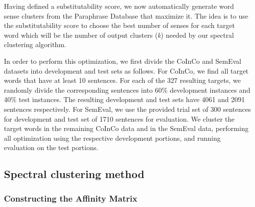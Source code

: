 \documentclass[11pt]{article}
\begin{document}
Having defined a substitutability score, we now automatically generate word sense clusters from the Paraphrase Database that maximize it. The idea is to use the substitutability score to choose the best number of senses for each target word which will be the number of output clusters (\textit{k}) needed by our spectral clustering algorithm. 

In order to perform this optimization, we first divide the CoInCo and SemEval datasets into development and test sets as follows. For CoInCo, we find all target words that have at least 10 sentences. For each of the 327 resulting targets, we randomly divide the corresponding sentences into 60\% development instances and 40\% test instances. The resulting development and test sets have 4061 and 2091 sentences respectively. For SemEval, we use the provided trial set of 300 sentences for development and test set of 1710 sentences for evaluation. We cluster the target words in the remaining CoInCo data and in the SemEval data, performing all optimization using the respective development portions, and running evaluation on the test portions.

\subsection{Spectral clustering method}
\subsubsection{Constructing the Affinity Matrix}
\end{document}
